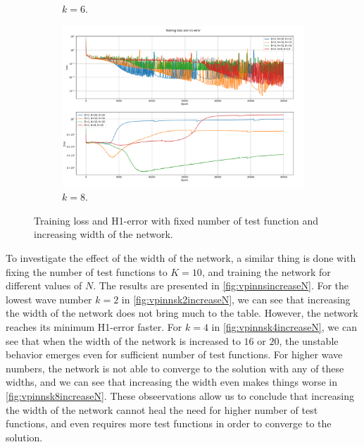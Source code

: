 \begin{figure}[h!]
\begin{subfigure}[b]{0.48\textwidth}
        \caption{$k=6$.}
        \label{fig:vpinnsk6increaseN}
    \end{subfigure}
    \hfill
    \begin{subfigure}[b]{0.48\textwidth}
        \includegraphics[width=\textwidth]{img/VPINN-Comparison-k8increaseN.png}
        \caption{$k=8$.}
        \label{fig:vpinnsk8increaseN}
    \end{subfigure}
    \caption{Training loss and H1-error with fixed number of test function and increasing width of the network.}
    \label{fig:vpinnsincreaseN}
\end{figure}

To investigate the effect of the width of the network, a similar thing is done with fixing the number of test functions to $K=10$, and training the network for different values of $N$. The results are presented in \autoref{fig:vpinnsincreaseN}. For the lowest wave number $k=2$ in \autoref{fig:vpinnsk2increaseN}, we can see that increasing the width of the network does not bring much to the table. However, the network reaches its minimum H1-error faster. For $k=4$ in \autoref{fig:vpinnsk4increaseN}, we can see that when the width of the network is increased to $16$ or $20$, the unstable behavior emerges even for sufficient number of test functions. For higher wave numbers, the network is not able to converge to the solution with any of these widths, and we can see that increasing the width even makes things worse in \autoref{fig:vpinnsk8increaseN}. These obseervations allow us to conclude that increasing the width of the network cannot heal the need for higher number of test functions, and even requires more test functions in order to converge to the solution.

